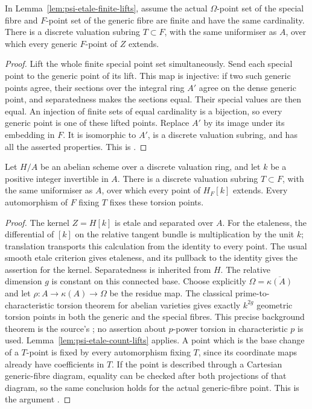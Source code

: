 \begin{srlemma}
\label{lem:psi-etale-count-lifts}
In Lemma~\ref{lem:psi-etale-finite-lifts}, assume the actual \(\Omega\)-point set of the special fibre and
\(F\)-point set of the generic fibre are finite and have the same
cardinality.
There is a discrete valuation subring \(T\subset F\), with the same
uniformiser as \(A\), over which every generic \(F\)-point of \(Z\)
extends.
\end{srlemma}
\begin{proof}
Lift the whole finite special point set simultaneously.
Send each special point to the generic point of its lift.
This map is injective: if two such generic points agree, their
sections over the integral ring \(A'\) agree on the dense generic
point, and separatedness makes the sections equal.  Their special
values are then equal.  An injection of finite sets of equal
cardinality is a bijection, so every generic point is one of these
lifted points.  Replace \(A'\) by its image under its embedding in
\(F\).  It is isomorphic to \(A'\), is a discrete valuation subring,
and has all the asserted properties.  This is
.
\end{proof}

\begin{srproposition}
\label{prop:psi-good-reduction-torsion}
Let \(H/A\) be an abelian scheme over a discrete valuation ring, and
let \(k\) be a positive integer invertible in \(A\).
There is a discrete valuation subring \(T\subset F\), with the same
uniformiser as \(A\), over which every point of \(H_F[k]\) extends.
Every automorphism of \(F\) fixing \(T\) fixes these torsion points.
\end{srproposition}
\begin{proof}
The kernel \(Z=H[k]\) is etale and separated over \(A\).
For the etaleness, the differential of \([k]\) on the relative tangent
bundle is multiplication by the unit \(k\); translation transports
this calculation from the identity to every point.  The usual
smooth etale criterion gives etaleness, and its pullback to the
identity gives the assertion for the kernel.  Separatedness is
inherited from \(H\).
The relative dimension \(g\) is constant on this connected base.
Choose explicitly \(\Omega=\overline{\kappa(A)}\) and let
\(\rho:A\to\kappa(A)\to\Omega\) be the residue map.
The classical prime-to-characteristic torsion theorem for abelian
varieties gives exactly \(k^{2g}\) geometric torsion points in both
the generic and the special fibres.  This precise background theorem
is the source's
; no assertion about
\(p\)-power torsion in characteristic \(p\) is used.
Lemma~\ref{lem:psi-etale-count-lifts} applies.
A point which is the base change of a \(T\)-point is fixed by every
automorphism fixing \(T\), since its coordinate maps already have
coefficients in \(T\).  If the point is described through a Cartesian
generic-fibre diagram, equality can be checked after both
projections of that diagram, so the same conclusion holds for the
actual generic-fibre point.  This is the argument
.
\end{proof}


